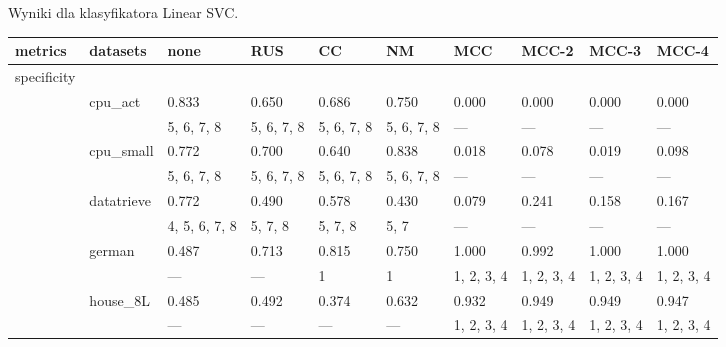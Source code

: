 \documentclass{article}
\begin{document}
\newpage
\begin{center}
\caption{Wyniki dla klasyfikatora Linear SVC.}\label{tab:my_label_LinearSVC}
\begin{longtable}{p{1.2cm}p{1.8cm}p{1cm}p{1cm}p{1cm}p{1cm}p{1cm}p{1cm}p{1cm}p{1cm}}
\hline
 metrics     & datasets     & none             & RUS              & CC               & NM               & MCC        & MCC-2         & MCC-3         & MCC-4         \\
\hline
\endhead
 specificity &              &                  &               &               &               &               &            &                  &               \\
             & cpu\_act      & 0.833            & 0.650         & 0.686         & 0.750         & 0.000         & 0.000      & 0.000            & 0.000         \\
             &              & 5, 6, 7, 8       & 5, 6, 7, 8    & 5, 6, 7, 8    & 5, 6, 7, 8    & ---           & ---        & ---              & ---           \\
             & cpu\_small    & 0.772            & 0.700         & 0.640         & 0.838         & 0.018         & 0.078      & 0.019            & 0.098         \\
             &              & 5, 6, 7, 8       & 5, 6, 7, 8    & 5, 6, 7, 8    & 5, 6, 7, 8    & ---           & ---        & ---              & ---           \\
             & datatrieve   & 0.772            & 0.490         & 0.578         & 0.430         & 0.079         & 0.241      & 0.158            & 0.167         \\
             &              & 4, 5, 6, 7, 8    & 5, 7, 8       & 5, 7, 8       & 5, 7          & ---           & ---        & ---              & ---           \\
             & german       & 0.487            & 0.713         & 0.815         & 0.750         & 1.000         & 0.992      & 1.000            & 1.000         \\
             &              & ---              & ---           & 1             & 1             & 1, 2, 3, 4    & 1, 2, 3, 4 & 1, 2, 3, 4       & 1, 2, 3, 4    \\
             & house\_8L     & 0.485            & 0.492         & 0.374         & 0.632         & 0.932         & 0.949      & 0.949            & 0.947         \\
             &              & ---              & ---           & ---           & ---           & 1, 2, 3, 4    & 1, 2, 3, 4 & 1, 2, 3, 4       & 1, 2, 3, 4    \\

\end{longtable}
\end{center}
\end{document}
